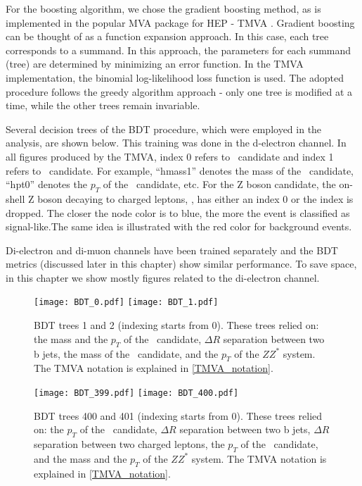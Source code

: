 For the boosting algorithm, we chose the gradient boosting method, as is implemented in the popular MVA package for HEP - TMVA \cite{Hocker:2007ht}. Gradient boosting can be thought of as a function expansion approach. In this case, each tree corresponds to a summand. In this approach, the parameters for each summand (tree) are determined by minimizing an error function. In the TMVA implementation, the binomial log-likelihood loss function is used. The adopted procedure follows the greedy algorithm approach - only one tree is modified at a time, while the other trees remain invariable.

Several decision trees of the BDT procedure, which were employed in the analysis, are shown below. This training was done in the d-electron channel. In all figures produced by the TMVA, index 0 refers to \HZZ~candidate and index 1 refers to \HBB~candidate. For example, ``hmass1'' denotes the mass of the \HZZ~candidate, ``hpt0'' denotes the $p_T$ of the \HBB~candidate, etc. For the Z boson candidate, the on-shell Z boson decaying to charged leptons, \Zll, has either an index 0 or the index is dropped. The closer the node color is to blue, the more the event is classified as signal-like.The same idea is illustrated with the red color for background events. \label{TMVA_notation}

Di-electron and di-muon channels have been trained separately and the BDT metrics (discussed later in this chapter) show similar performance. To save space, in this chapter we show mostly figures related to the di-electron channel.

\begin{figure}[H]
\begin{center}
\texttt{[image: BDT\_0.pdf]}
\texttt{[image: BDT\_1.pdf]}\\
\caption[BDT trees 1 and 2.]{BDT trees 1 and 2 (indexing starts from 0). These trees relied on: the mass and the $p_T$ of the \Zll~candidate, $\Delta R$ separation between two b jets, the mass of the \HBB~candidate, and the $p_T$ of the $ZZ^*$ system. The TMVA notation is explained in \ref{TMVA_notation}.}
\label{fig:bdt_trees}
\end{center}
\end{figure}

\begin{figure}[H]
\begin{center}
\texttt{[image: BDT\_399.pdf]}
\texttt{[image: BDT\_400.pdf]}\\
\caption[BDT trees 400 and 401.]{BDT trees 400 and 401 (indexing starts from 0). These trees relied on: the $p_T$ of the \Zll~candidate, 
$\Delta R$ separation between two b jets,
$\Delta R$ separation between two charged leptons, 
the $p_T$ of the \HBB~candidate, and the mass and the $p_T$ of the $ZZ^*$ system. The TMVA notation is explained in \ref{TMVA_notation}.} 
\label{fig:bdt_trees_2}
\end{center}
\end{figure}

